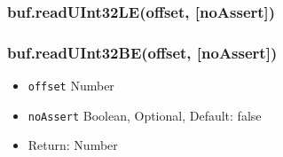 \begin{Shaded}
\begin{Highlighting}[]
  \NormalTok{(}\NormalTok{);}

\NormalTok{buf[}\NormalTok{] = }\NormalTok{;}
\NormalTok{buf[}\NormalTok{] = }\NormalTok{;}
\NormalTok{buf[}\NormalTok{] = }\NormalTok{;}
\NormalTok{buf[}\NormalTok{] = }\NormalTok{;}

\NormalTok{(}\NormalTok{(}\NormalTok{));}
\NormalTok{(}\NormalTok{(}\NormalTok{));}
\NormalTok{(}\NormalTok{(}\NormalTok{));}
\NormalTok{(}\NormalTok{(}\NormalTok{));}
\NormalTok{(}\NormalTok{(}\NormalTok{));}
\NormalTok{(}\NormalTok{(}\NormalTok{));}

\end{Highlighting}
\end{Shaded}

\subsubsection{buf.readUInt32LE(offset,
{[}noAssert{]})}\label{buf.readuint32leoffset-noassert}

\subsubsection{buf.readUInt32BE(offset,
{[}noAssert{]})}\label{buf.readuint32beoffset-noassert}

\begin{itemize}
\itemsep1pt\parskip0pt
\item
  \texttt{offset} Number
\item
  \texttt{noAssert} Boolean, Optional, Default: false
\item
  Return: Number
\end{itemize}

